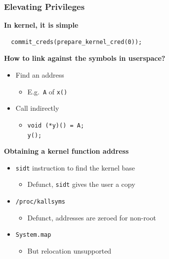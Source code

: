 \documentclass[xcolor=dvipsnames]{beamer}
\newcommand{\heading}[1]{\textbf{\textcolor{BurntOrange}{#1}}}
\newcommand{\cmd}[2][]{\lstinline[columns=fullflexible, language=bash,
	basicstyle=\ttfamily, #1]$#2$}
\newcommand{\code}[2][]{\lstinline[columns=fullflexible, basicstyle=\ttfamily,
	#1]$#2$}
\begin{document}
\begin{frame}[fragile]
  \frametitle{Elevating Privileges}

  \heading{In kernel, it is simple}
\begin{lstlisting}
  commit_creds(prepare_kernel_cred(0));
\end{lstlisting}

  \pause
  \medskip

  \heading{How to link against the symbols in userspace?}
  \begin{itemize}
    \item Find an address
    \begin{itemize}
      \item E.g.\ \code{A} of \code{x()}
    \end{itemize}
    \item Call indirectly
    \begin{itemize}
      \item \code{void (*y)() = A;} \\ \code{y();}
    \end{itemize}
  \end{itemize}

  \pause
  \medskip

  \heading{Obtaining a kernel function address}
  \begin{itemize}
    \item \code{sidt} instruction to find the kernel base
    \begin{itemize}
      \item Defunct, \code{sidt} gives the user a copy
    \end{itemize}

    \pause

    \item \cmd{/proc/kallsyms}
    \begin{itemize}
      \item Defunct, addresses are zeroed for non-root
    \end{itemize}

    \pause

    \item \cmd{System.map}
    \begin{itemize}
      \item But relocation unsupported
    \end{itemize}
  \end{itemize}

\end{frame}
\end{document}
